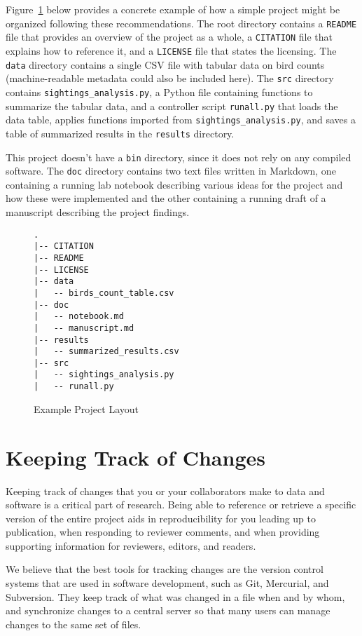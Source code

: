 \documentclass[10pt]{article}
\begin{document}
Figure~\ref{fig:layout} below provides a concrete example of how a
simple project might be organized following these recommendations. The
root directory contains a \texttt{README} file that provides an
overview of the project as a whole, a \texttt{CITATION} file that
explains how to reference it, and a \texttt{LICENSE} file that states the 
licensing. The \texttt{data} directory contains a
single CSV file with tabular data on bird counts (machine-readable
metadata could also be included here). The \texttt{src} directory
contains \texttt{sightings\_analysis.py}, a Python file containing
functions to summarize the tabular data, and a controller script
\texttt{runall.py} that loads the data table, applies functions
imported from \texttt{sightings\_analysis.py}, and saves a table of
summarized results in the \texttt{results} directory.

This project doesn't have a \texttt{bin} directory, since it does not
rely on any compiled software. The \texttt{doc} directory contains two
text files written in Markdown, one containing a running lab notebook
describing various ideas for the project and how these were
implemented and the other containing a running draft of a manuscript
describing the project findings.

\begin{figure}
\begin{verbatim}
.
|-- CITATION
|-- README
|-- LICENSE
|-- data
|   -- birds_count_table.csv
|-- doc
|   -- notebook.md
|   -- manuscript.md
|-- results
|   -- summarized_results.csv
|-- src
|   -- sightings_analysis.py
|   -- runall.py
\end{verbatim}
\caption{Example Project Layout}
\label{fig:layout}
\end{figure}

\section{Keeping Track of Changes}\label{sec:versioning}

Keeping track of changes that you or your collaborators make to data
and software is a critical part of research. Being able to reference or 
retrieve a specific version of the entire project aids in reproducibility 
for you leading up to publication, when responding to reviewer comments, 
and when providing supporting information for reviewers, editors, 
and readers. 

We believe that the best tools for tracking changes are the version 
control systems that are used in software development, such as Git, 
Mercurial, and Subversion. They keep track of what was changed in a 
file when and by whom, and synchronize changes to a central server so 
that many users can manage changes to the same set of files. 
\end{document}
